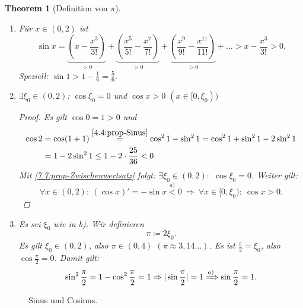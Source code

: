 \documentclass[12pt]{extreport} %
\theoremstyle{named}
\newtheorem{unnamedtheorem}{Theorem} \counterwithin{unnamedtheorem}{chapter}
\theoremstyle{itshape}
\theoremstyle{normal}
\begin{document}
{\begin{unnamedtheorem}[Definition von $\pi$] ~\ \label{9.14:prop-DefPi}
	\begin{enumerate}
		\item Für $x \in (0, 2)$ ist
			$$ \sin x = \underbrace{\left(x - \frac{x^{3}}{3!}\right)}_{> 0} + \underbrace{\left(\frac{x^{5}}{5!} - \frac{x^{7}}{7!}\right)}_{> 0} + 
			\underbrace{\left(\frac{x^{9}}{9!} - \frac{x^{11}}{11!}\right)}_{> 0} + \dotsc > x - \frac{x^{3}}{3!} > 0. $$
			Speziell: $\sin 1 > 1 - \frac{1}{6} = \frac{5}{6}$.
		\item $\exists \xi_{0} \in (0, 2)$: $\cos \xi_{0} = 0$ und $\cos x > 0$ $(x\in [0, \xi_{0}))$
		\begin{proof}
			Es gilt $\cos 0 = 1 > 0$ und 
			\begin{align*}
				\cos 2 & = \cos (1 + 1) \overset{\ref{4.4:prop-Sinus}}{=} \cos^{2} 1 - \sin^{2} 1 = \cos^{2} 1 + \sin^{2} 1 - 2 \sin^{2} 1 \\
					& = 1 - 2 \sin^{2} 1 \leq 1 - 2 \cdot \frac{25}{36} < 0.
			\end{align*} 
			Mit \ref{7.7:prop-Zwischenwertsatz} folgt:  $\exists \xi_{0} \in (0, 2):$ $\cos \xi_{0} = 0$. Weiter gilt:
			$$ \forall x \in (0,2): ~ (\cos x)' = - \sin x \overset{a)}< 0 ~ \Rightarrow ~ \forall x \in [0, \xi_{0}): ~ \cos x > 0.  $$
		\end{proof}
		\item Es sei $\xi_{0}$ wie in b). Wir definieren $$\pi \coloneqq 2 \xi_{0}.$$ 
		Es gilt $\xi_{0} \in (0, 2)$, also $\pi \in (0, 4)$ $(\pi \approx 3,14\dotsc)$. Es ist	$\frac{\pi}{2} = \xi_{0}$, also $\cos \frac{\pi}{2} = 0$.
		Damit gilt:
		$$ \sin^{2} \frac{\pi}{2}= 1 - \cos^{2} \frac{\pi}{2} = 1 \Rightarrow | \sin \frac{\pi}{2} | = 1 \xRightarrow[]{a)} \sin \frac{\pi}{2} = 1. $$
		\end{enumerate}	 
\end{unnamedtheorem}


\begin{figure*}[!ht] \centering
	\caption{Sinus und Cosinus.}	
\end{figure*}

}
\end{document}
